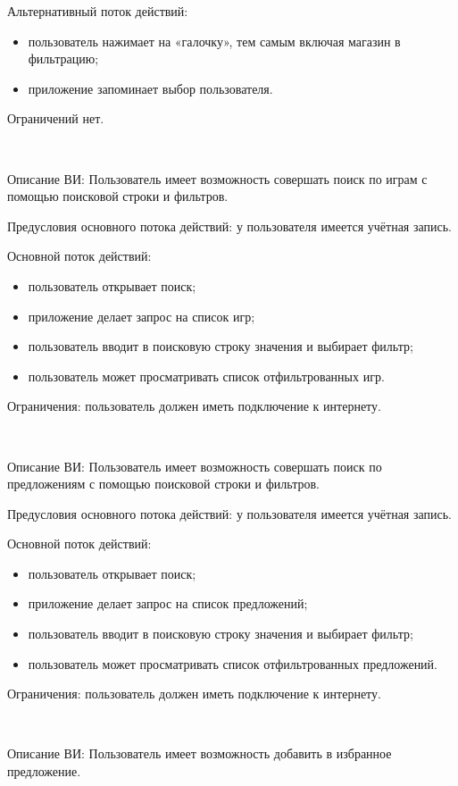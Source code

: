 Альтернативный поток действий:
\begin{itemize}
   \item пользователь нажимает на «галочку», тем самым включая магазин в фильтрацию;
   \item приложение запоминает выбор пользователя.
\end{itemize}
 
Ограничений нет.

~\par
\label{use:searchgames}
Описание ВИ: Пользователь имеет возможность совершать поиск по играм с помощью поисковой строки и фильтров.
 
Предусловия основного потока действий: у пользователя имеется учётная запись.
 
Основной поток действий:
\begin{itemize}
   \item пользователь открывает поиск;
   \item приложение делает запрос на список игр;
   \item пользователь вводит в поисковую строку значения и выбирает фильтр;
   \item пользователь может просматривать список отфильтрованных игр.
\end{itemize}
 
Ограничения: пользователь должен иметь подключение к интернету.

~\par
\label{use:searchdeals}
Описание ВИ: Пользователь имеет возможность совершать поиск по предложениям с помощью поисковой строки и фильтров.
 
Предусловия основного потока действий: у пользователя имеется учётная запись.
 
Основной поток действий:
\begin{itemize}
   \item пользователь открывает поиск;
   \item приложение делает запрос на список предложений;
   \item пользователь вводит в поисковую строку значения и выбирает фильтр;
   \item пользователь может просматривать список отфильтрованных предложений.
\end{itemize}
 
Ограничения: пользователь должен иметь подключение к интернету.

~\par
\label{use:favoritedeals}
Описание ВИ: Пользователь имеет возможность добавить в избранное предложение.
 
